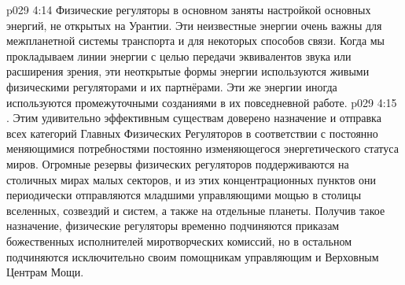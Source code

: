 \vs p029 4:14 Физические регуляторы в основном заняты настройкой основных энергий, не открытых на Урантии. Эти неизвестные энергии очень важны для межпланетной системы транспорта и для некоторых способов связи. Когда мы прокладываем линии энергии с целью передачи эквивалентов звука или расширения зрения, эти неоткрытые формы энергии используются живыми физическими регуляторами и их партнёрами. Эти же энергии иногда используются промежуточными созданиями в их повседневной работе.
\vs p029 4:15 . Этим удивительно эффективным существам доверено назначение и отправка всех категорий Главных Физических Регуляторов в соответствии с постоянно меняющимися потребностями постоянно изменяющегося энергетического статуса миров. Огромные резервы физических регуляторов поддерживаются на столичных мирах малых секторов, и из этих концентрационных пунктов они периодически отправляются младшими управляющими мощью в столицы вселенных, созвездий и систем, а также на отдельные планеты. Получив такое назначение, физические регуляторы временно подчиняются приказам божественных исполнителей миротворческих комиссий, но в остальном подчиняются исключительно своим помощникам управляющим и Верховным Центрам Мощи.

